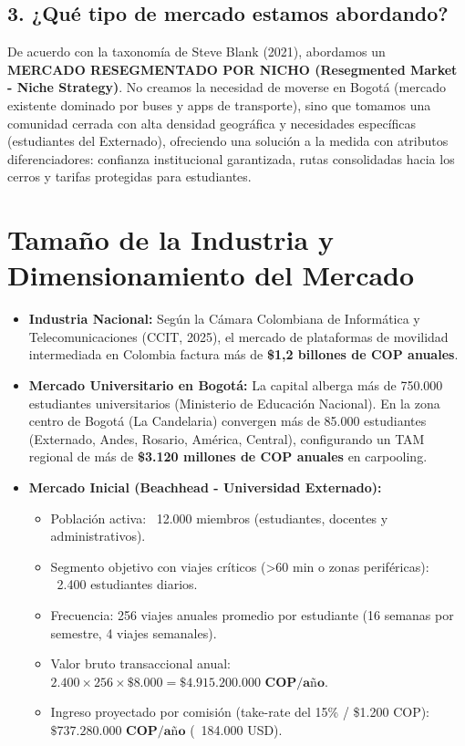 \documentclass[11pt,a4paper]{article}
\begin{document}
\subsection{3. ¿Qué tipo de mercado estamos abordando?}
De acuerdo con la taxonomía de Steve Blank (2021), abordamos un \textbf{MERCADO RESEGMENTADO POR NICHO (Resegmented Market - Niche Strategy)}. No creamos la necesidad de moverse en Bogotá (mercado existente dominado por buses y apps de transporte), sino que tomamos una comunidad cerrada con alta densidad geográfica y necesidades específicas (estudiantes del Externado), ofreciendo una solución a la medida con atributos diferenciadores: confianza institucional garantizada, rutas consolidadas hacia los cerros y tarifas protegidas para estudiantes.

\section{Tamaño de la Industria y Dimensionamiento del Mercado}

\begin{itemize}[leftmargin=*]
    \item \textbf{Industria Nacional:} Según la Cámara Colombiana de Informática y Telecomunicaciones (CCIT, 2025), el mercado de plataformas de movilidad intermediada en Colombia factura más de \textbf{\$1,2 billones de COP anuales}.
    \item \textbf{Mercado Universitario en Bogotá:} La capital alberga más de 750.000 estudiantes universitarios (Ministerio de Educación Nacional). En la zona centro de Bogotá (La Candelaria) convergen más de 85.000 estudiantes (Externado, Andes, Rosario, América, Central), configurando un TAM regional de más de \textbf{\$3.120 millones de COP anuales} en carpooling.
    \item \textbf{Mercado Inicial (Beachhead - Universidad Externado):}
    \begin{itemize}
        \item Población activa: ~12.000 miembros (estudiantes, docentes y administrativos).
        \item Segmento objetivo con viajes críticos (>60 min o zonas periféricas): ~2.400 estudiantes diarios.
        \item Frecuencia: 256 viajes anuales promedio por estudiante (16 semanas por semestre, 4 viajes semanales).
        \item Valor bruto transaccional anual: $2.400 \times 256 \times \$8.000 = \mathbf{\$4.915.200.000\text{ COP/año}}$.
        \item Ingreso proyectado por comisión (take-rate del 15\% / \$1.200 COP): $\mathbf{\$737.280.000\text{ COP/año}}$ (~184.000 USD).
    \end{itemize}
\end{itemize}
\end{document}
